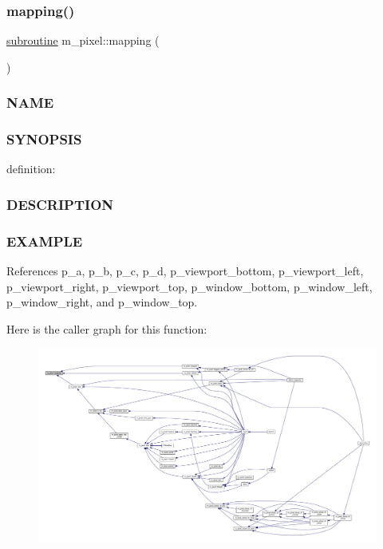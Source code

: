 \subsubsection{\texorpdfstring{mapping()}{mapping()}}
{\footnotesize\ttfamily \hyperlink{M__stopwatch_83_8txt_acfbcff50169d691ff02d4a123ed70482}{subroutine} m\+\_\+pixel\+::mapping (\begin{DoxyParamCaption}{ }\end{DoxyParamCaption})\hspace{0.3cm}{\ttfamily [private]}}



\subsubsection*{N\+A\+ME}

\subsubsection*{S\+Y\+N\+O\+P\+S\+IS}

definition\+:

\subsubsection*{D\+E\+S\+C\+R\+I\+P\+T\+I\+ON}

\subsubsection*{E\+X\+A\+M\+P\+LE}

References p\+\_\+a, p\+\_\+b, p\+\_\+c, p\+\_\+d, p\+\_\+viewport\+\_\+bottom, p\+\_\+viewport\+\_\+left, p\+\_\+viewport\+\_\+right, p\+\_\+viewport\+\_\+top, p\+\_\+window\+\_\+bottom, p\+\_\+window\+\_\+left, p\+\_\+window\+\_\+right, and p\+\_\+window\+\_\+top.

Here is the caller graph for this function\+:
\nopagebreak
\begin{figure}[H]
\begin{center}
\leavevmode
\includegraphics[width=350pt]{namespacem__pixel_a84c841de62fc0addddeff305c4ede9d4_icgraph}
\end{center}
\end{figure}
\mbox{\label{namespacem__pixel_ab5d4dc474ff84dc0f3f35f4a395979e0}} 

